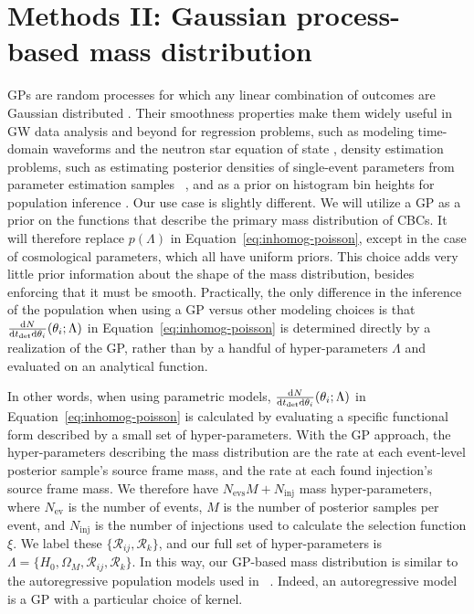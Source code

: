 \documentclass[]{aastex631}
\begin{document}
\section{Methods II: Gaussian process-based mass distribution}
\label{sec:model}
\Acfp{GP} are random processes for which any linear combination of outcomes are Gaussian distributed \citep{rasmussen_gaussian_2006}.
Their smoothness properties make them widely useful in \ac{GW} data analysis and beyond for regression problems, such as modeling time-domain waveforms \citep{doctor_statistical_2017, huerta_eccentric_2018} and the neutron star equation of state \citep{landry_nonparametric_2019}, density estimation problems, such as estimating posterior densities of single-event parameters from parameter estimation samples ~\citep{demilio_density_2021}, and as a prior on histogram bin heights for population inference \citep{mandel_model-independent_2017, li_flexible_2021, ray_non-parametric_2023}.
Our use case is slightly different.
We will utilize a \ac{GP} as a prior on the functions that describe the primary mass distribution of \acp{CBC}.
It will therefore replace $p(\Lambda)$ in Equation~\ref{eq:inhomog-poisson}, except in the case of cosmological parameters, which all have uniform priors.
This choice adds very little prior information about the shape of the mass distribution, besides enforcing that it must be smooth.
Practically, the only difference in the inference of the population when using a GP versus other modeling choices is that $\frac{\text{d} N}{\text{d} t_{\det} \text{d} \theta_i} (\theta_i;\Lambda)$ in Equation~\ref{eq:inhomog-poisson} is determined directly by a realization of the \ac{GP}, rather than by a handful of hyper-parameters $\Lambda$ and evaluated on an analytical function.

In other words, when using parametric models, $\frac{\text{d} N}{\text{d} t_{\det} \text{d} \theta_i} (\theta_i;\Lambda)$ in Equation~\ref{eq:inhomog-poisson} is calculated by evaluating a specific functional form described by a small set of hyper-parameters. 
With the GP approach, the hyper-parameters describing the mass distribution are the rate at each event-level posterior sample's source frame mass, and the rate at each found injection's source frame mass.
We therefore have $N_{\text{evs}}M + N_{\text{inj}}$ mass hyper-parameters, where $N_{\text{ev}}$ is the number of events, $M$ is the number of posterior samples per event, and $N_{\text{inj}}$ is the number of injections used to calculate the selection function $\xi$.
We label these $\{\mathcal{R}_{ij},\mathcal{R}_k\}$, and our full set of hyper-parameters is $\Lambda=\{H_0, \Omega_M, \mathcal{R}_{ij},\mathcal{R}_k\}$. 
In this way, our GP-based mass distribution is similar to the autoregressive population models used in ~\citet{callister_parameter-free_2023}.
Indeed, an autoregressive model is a \ac{GP} with a particular choice of kernel.
\end{document}
